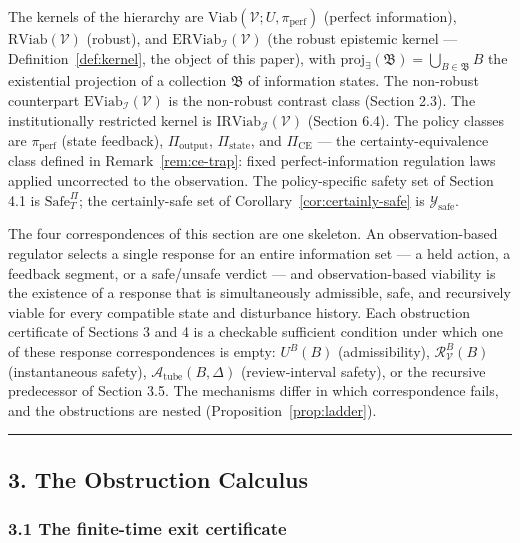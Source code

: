 \documentclass[11pt]{article}
\theoremstyle{definition}
\begin{document}
The kernels of the hierarchy are
\(\mathrm{Viab}(\mathcal{V}; U, \pi_{\mathrm{perf}})\) (perfect
information), \(\mathrm{RViab}(\mathcal{V})\) (robust), and
\(\mathrm{ERViab}_{\mathcal{I}}(\mathcal{V})\) (the robust epistemic
kernel --- Definition~\ref{def:kernel}, the object of this paper), with
\(\mathrm{proj}_{\exists}(\mathfrak{B}) = \bigcup_{B \in \mathfrak{B}} B\)
the existential projection of a collection \(\mathfrak{B}\) of
information states. The non-robust counterpart
\(\mathrm{EViab}_{\mathcal{I}}(\mathcal{V})\) is the non-robust contrast class (Section 2.3). The institutionally restricted kernel is \(\mathrm{IRViab}_{\mathcal{J}}(\mathcal{V})\) (Section 6.4). The policy classes
are \(\pi_{\mathrm{perf}}\) (state feedback), \(\Pi_{\mathrm{output}}\),
\(\Pi_{\mathrm{state}}\), and \(\Pi_{\mathrm{CE}}\) --- the
certainty-equivalence class defined in Remark~\ref{rem:ce-trap}: fixed
perfect-information regulation laws applied uncorrected to the
observation. The policy-specific safety set of Section 4.1 is
\(\mathrm{Safe}^{\Pi}_T\); the certainly-safe set of Corollary~\ref{cor:certainly-safe} is
\(\mathcal{Y}_{\mathrm{safe}}\).

The four correspondences of this section are one skeleton. An
observation-based regulator selects a single response for an entire
information set --- a held action, a feedback segment, or a
safe/unsafe verdict --- and observation-based viability is the existence
of a response that is simultaneously admissible, safe, and recursively
viable for every compatible state and disturbance history. Each
obstruction certificate of Sections 3 and 4 is a checkable sufficient
condition under which one of these response correspondences is empty:
\(U^B(B)\) (admissibility), \(\mathcal{R}_{\mathcal{V}}^B(B)\)
(instantaneous safety), \(\mathcal{A}_{\mathrm{tube}}(B,\Delta)\)
(review-interval safety), or the recursive predecessor of Section 3.5.
The mechanisms differ in which correspondence fails, and the
obstructions are nested (Proposition~\ref{prop:ladder}).

\begin{center}\rule{0.5\linewidth}{0.5pt}\end{center}

\subsection{3. The Obstruction Calculus}\label{the-obstruction-calculus}

\subsubsection{3.1 The finite-time exit
certificate}\label{the-finite-time-exit-certificate}
\end{document}

